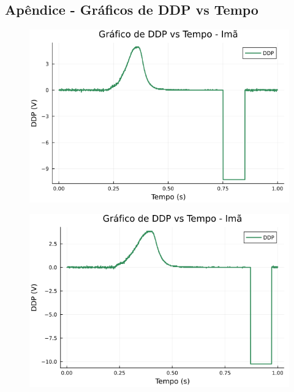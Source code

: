 \subsection*{Apêndice - Gráficos de DDP vs Tempo}
\begin{center}
\begin{multicols}{2}

\begin{figure}[H]
    \centering
    \includegraphics[width=1.0\linewidth]{figuras/grafico_dados1_F0002CH1.png}
\end{figure}

\begin{figure}[H]
    \centering
    \includegraphics[width=1.0\linewidth]{figuras/grafico_dados1_F0003CH1.png}
\end{figure}


\end{multicols}
\end{center}
